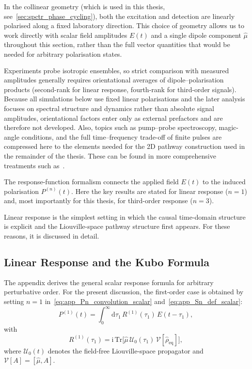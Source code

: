 In the collinear geometry (which is used in this thesis, see~\autoref{sec:spctr_phase_cycling}), both the excitation and detection are linearly polarised along a fixed laboratory direction. This choice of geometry allows us to work directly with scalar field amplitudes $E(t)$ and a single dipole component $\hat{\mu}$ throughout this section, rather than the full vector quantities that would be needed for arbitrary polarisation states.

Experiments probe isotropic ensembles, so strict comparison with measured amplitudes generally requires orientational averages of dipole--polarisation products (second-rank for linear response, fourth-rank for third-order signals). Because all simulations below use fixed linear polarisations and the later analysis focuses on spectral structure and dynamics rather than absolute signal amplitudes, orientational factors enter only as external prefactors and are therefore not developed.
Also, topics such as pump--probe spectroscopy, magic-angle conditions, and the full time--frequency trade-off of finite pulses are compressed here to the elements needed for the 2D pathway construction used in the remainder of the thesis. These can be found in more comprehensive treatments such as~\cite{mancal2022nonlinearopticalspectroscopy}.

The response-function formalism connects the applied field $E(t)$ to the induced polarisation $P^{(n)}(t)$.
Here the key results are stated for linear response ($n=1$) and, most importantly for this thesis, for third-order response ($n=3$).

Linear response is the simplest setting in which the causal time-domain structure is explicit and the Liouville-space pathway structure first appears.
For these reasons, it is discussed in detail.

\subsection{Linear Response and the Kubo Formula}
\label{sec:spctr_linear_response}
The appendix derives the general scalar response formula for arbitrary perturbative order.
For the present discussion, the first-order case is obtained by setting $n=1$ in~\autoref{eq:app_Pn_convolution_scalar} and~\autoref{eq:app_Sn_def_scalar}:
\begin{equation}
P^{(1)}(t)
= \int_{0}^{\infty}\!\mathrm{d}\tau_1\,R^{(1)}(\tau_1)\,E(t-\tau_1),
\label{eq:spctr_P1_convolution_thesis}
\end{equation}
with
\begin{equation}
R^{(1)}(\tau_1)
= \mathrm{i}\,\mathrm{Tr}\bigl[\hat{\mu}\,\mathcal{U}_0(\tau_1)\,\mathcal{V}[\hat{\rho}_{\mathrm{eq}}]\bigr],
\label{eq:spctr_S1_def_superop_thesis}
\end{equation}
where $\mathcal{U}_0(t)$ denotes the field-free Liouville-space propagator and $\mathcal{V}[A] = [\hat{\mu},A]$.


